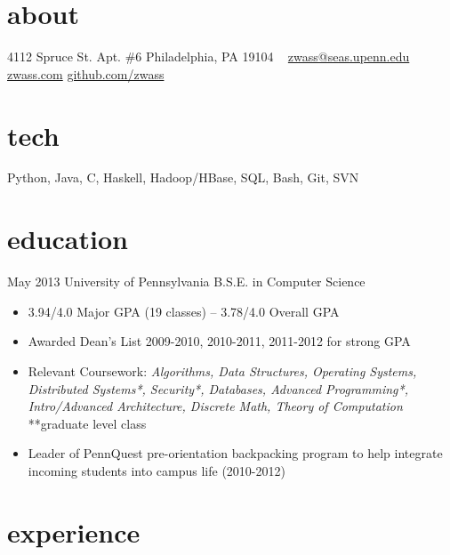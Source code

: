 \documentclass[]{friggeri-cv}
\begin{document}
       


\begin{aside}
  \section{about}
  4112 Spruce St.
  Apt. \#6
  Philadelphia, PA 19104
  ~
  \href{mailto:zwass@seas.upenn.edu}{zwass@seas.upenn.edu}
  \href{http://zwass.com}{zwass.com}
  \href{http://github.com/zwass}{github.com/zwass}
  \section{tech}
  Python, Java,
  C, Haskell,
  Hadoop/HBase,
  SQL, Bash, Git, SVN
\end{aside}

\vspace{\parskip}
\section{education}

\begin{entrylist}
  \entry
    {May 2013}
    {University of Pennsylvania}
    {B.S.E. in Computer Science}
    {\begin{itemize}
      \item 3.94/4.0 Major GPA (19 classes) – 3.78/4.0 Overall GPA
      \item Awarded Dean’s List 2009-2010, 2010-2011, 2011-2012 for strong GPA
      \item Relevant Coursework: \emph{Algorithms, Data Structures, Operating Systems,\\
          Distributed Systems*, Security*, Databases, Advanced
          Programming*,\\ Intro/Advanced Architecture, Discrete Math,
          Theory of Computation}\\
        **graduate level class
      \item Leader of PennQuest pre-orientation backpacking program to
        help integrate incoming students into campus life (2010-2012)
    \end{itemize}
    }
\end{entrylist}

\section{experience}
\end{document}

